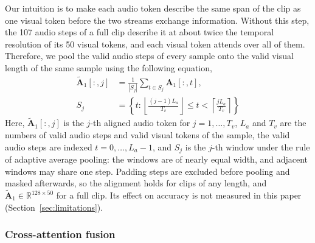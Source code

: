 \documentclass[pdflatex,iicol,sn-basic]{sn-jnl}
\begin{document}
Our intuition is to make each audio token describe the same span of the clip as one visual token before the two streams exchange information. Without this step, the 107 audio steps of a full clip describe it at about twice the temporal resolution of its 50 visual tokens, and each visual token attends over all of them. Therefore, we pool the valid audio steps of every sample onto the valid visual length of the same sample using the following equation,
\begin{equation}
\begin{split}
\tilde{\mathbf{A}}_1[:, j] &= \frac{1}{|S_j|}\sum_{t \in S_j} \mathbf{A}_1[:, t],\\
S_j &= \left\{ t : \left\lfloor \tfrac{(j-1)L_a}{T_v} \right\rfloor \le t < \left\lceil \tfrac{j L_a}{T_v} \right\rceil \right\}
\end{split}
\end{equation}
Here, $\tilde{\mathbf{A}}_1[:, j]$ is the $j$-th aligned audio token for $j = 1, \dots, T_v$, $L_a$ and $T_v$ are the numbers of valid audio steps and valid visual tokens of the sample, the valid audio steps are indexed $t = 0, \dots, L_a - 1$, and $S_j$ is the $j$-th window under the rule of adaptive average pooling: the windows are of nearly equal width, and adjacent windows may share one step. Padding steps are excluded before pooling and masked afterwards, so the alignment holds for clips of any length, and $\tilde{\mathbf{A}}_1 \in \mathbb{R}^{128 \times 50}$ for a full clip. Its effect on accuracy is not measured in this paper (Section~\ref{sec:limitations}).

\subsubsection{Cross-attention fusion}\label{sec:xattn}
\end{document}
